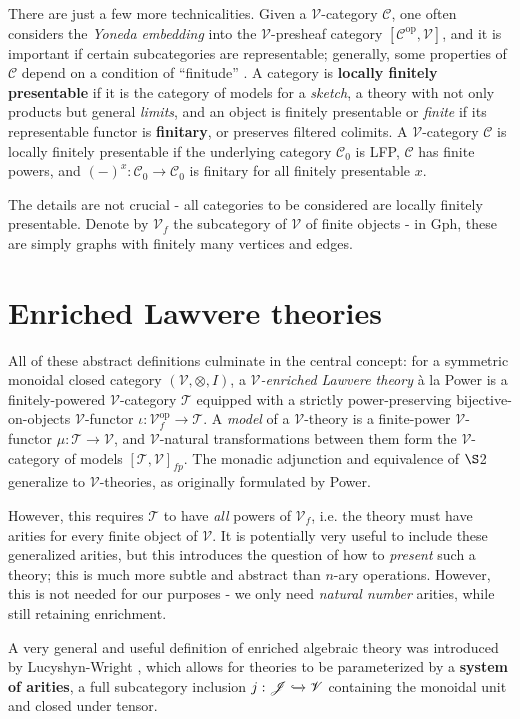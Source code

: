 \documentclass[a4paper,UKenglish]{article}
\theoremstyle{definition}
\newcommand{\Gph}{\mathrm{Gph}}
\newcommand{\op}{\mathrm{op}}
\newcommand{\V}{\mathscr{V}}
\newcommand{\C}{\mathscr{C}}
\newcommand{\J}{\mathscr{J}}
\newcommand{\T}{\mathscr{T}}
\begin{document}
There are just a few more technicalities. Given a $\V$-category $\C$, one often considers the \textit{Yoneda embedding} into the $\V$-presheaf category $[\C^\op, \V]$, and it is important if certain subcategories are representable; generally, some properties of $\C$ depend on a condition of ``finitude'' \cite{finite}. A category is \textbf{locally finitely presentable} if it is the category of models for a \textit{sketch}, a theory with not only products but general \textit{limits}, and an object is finitely presentable or \textit{finite} if its representable functor is \textbf{finitary}, or preserves filtered colimits. A $\V$-category $\C$ is locally finitely presentable if the underlying category $\C_0$ is LFP, $\C$ has finite powers, and $(-)^x: \C_0 \to \C_0$ is finitary for all finitely presentable $x$.

The details are not crucial - all categories to be considered are locally finitely presentable. Denote by $\V_f$ the subcategory of $\V$ of finite objects - in $\Gph$, these are simply graphs with finitely many vertices and edges.

\section{Enriched Lawvere theories}
All of these abstract definitions culminate in the central concept: for a symmetric monoidal closed category $(\V,\otimes,I)$, a \textit{$\V$-enriched Lawvere theory} \`a la Power \cite{power} is a finitely-powered $\V$-category $\T$ equipped with a strictly power-preserving bijective-on-objects $\V$-functor $\iota:\V_f^\op \to \T$. A \textit{model} of a $\V$-theory is a finite-power $\V$-functor $\mu:\T \to \V$, and $\V$-natural transformations between them form the $\V$-category of models $[\T,\V]_{fp}$. The monadic adjunction and equivalence of $\S$2 generalize to $\V$-theories, as originally formulated by Power.

However, this requires $\T$ to have \textit{all} powers of $\V_f$, i.e. the theory must have arities for every finite object of $\V$. It is potentially very useful to include these generalized arities, but this introduces the question of how to \textit{present} such a theory; this is much more subtle and abstract than $n$-ary operations. However, this is not needed for our purposes - we only need \textit{natural number} arities, while still retaining enrichment.

A very general and useful definition of enriched algebraic theory was introduced by Lucyshyn-Wright \cite{rbb}, which allows for theories to be parameterized by a \textbf{system of arities}, a full subcategory inclusion $j: \J \xhookrightarrow{} \V$ containing the monoidal unit and closed under tensor.
\end{document}

